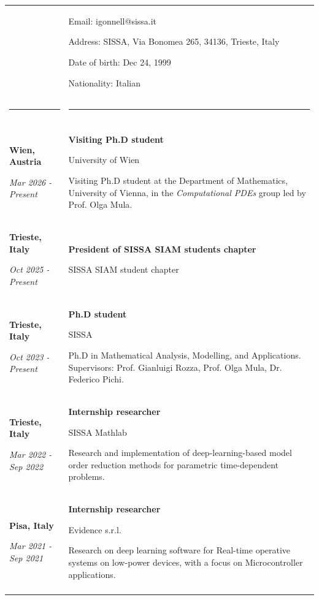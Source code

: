 \documentclass[a4paper]{article}
\newlength{\cvlabelwidth}\setlength{\cvlabelwidth}{88.8bp}
\newlength{\colgap}\setlength{\colgap}{9.5bp}
\newlength{\detailwidth}\setlength{\detailwidth}{\dimexpr\textwidth-\cvlabelwidth-\colgap\relax}
\newlength{\narrowwidth}\setlength{\narrowwidth}{\detailwidth}
\newlength{\cvitemsep}\setlength{\cvitemsep}{4.5bp}
\newcommand{\cvrowend}{\\\noalign{\vskip\cvitemsep}}
\newcommand{\cvbold}[1]{\textbf{\upshape #1}}
\newcommand{\cvlabel}[1]{\leavevmode{\color{cvblue}\upshape\bfseries\fontsize{8.5bp}{10.2bp}\selectfont\strut #1}}
\newcommand{\cvnarrow}[1]{\begin{minipage}[t]{\narrowwidth}\raggedright\strut #1\end{minipage}}
\newcommand{\cvdivider}{\noalign{\vskip 6bp}%
 {\color{cvblue!20}\rule{\cvlabelwidth}{0.6bp}} &
 {\color{cvblue!20}\rule{\narrowwidth}{0.6bp}}\\*[4bp]}
\newcommand{\cvheading}[1]{\cvlabel{#1} & \\*[5bp]}
\newcommand{\cventry}[5]{\cvbold{#1}\par\vspace{2.55bp}\textit{#2} &
 \cvbold{#3}\par\vspace{2.55bp}#4%
 \if\relax\detokenize{#5}\relax\else\par\vspace{6.65bp}#5\fi\cvrowend}
\newcommand{\cvitem}[2]{\cvlabel{#1} & #2\cvrowend}
\begin{document}
\fontsize{8.5bp}{10.2bp}\selectfont
{}
\vspace*{64bp}
\itshape
\begin{longtable}{@{}>{\raggedright\arraybackslash}p{\cvlabelwidth}@{\hspace{\colgap}}>{\raggedright\arraybackslash}p{\detailwidth}@{}}


\cvitem{CONTACT INFORMATION}{\cvnarrow{Email: igonnell@sissa.it\par\vspace{3bp}Address: SISSA, Via Bonomea 265, 34136, Trieste, Italy\par\vspace{3bp}Date of birth: Dec 24, 1999\par\vspace{3bp}Nationality: Italian}}

\cvdivider

\cvheading{EXPERIENCE}

\cventry{Wien, Austria}{Mar 2026 - Present}{Visiting Ph.D student}{University of Wien}{Visiting Ph.D student at the Department of Mathematics, University of Vienna, in the \textit{Computational PDEs }group led by Prof. Olga Mula.}

\cventry{Trieste, Italy}{Oct 2025 - Present}{President of SISSA SIAM students chapter}{SISSA SIAM student chapter}{}

\cventry{Trieste, Italy}{Oct 2023 - Present}{Ph.D student}{SISSA}{Ph.D in Mathematical Analysis, Modelling, and Applications. Supervisors: Prof. Gianluigi Rozza, Prof. Olga Mula, Dr. Federico Pichi.}

\cventry{Trieste, Italy}{Mar 2022 - Sep 2022}{Internship researcher}{SISSA Mathlab}{Research and implementation of deep-learning-based model order reduction methods for parametric time-dependent problems.}

\cventry{Pisa, Italy}{Mar 2021 - Sep 2021}{Internship researcher}{Evidence s.r.l.}{Research on deep learning software for Real-time operative systems on low-power devices, with a focus on Microcontroller applications.}


\end{longtable}
\end{document}
